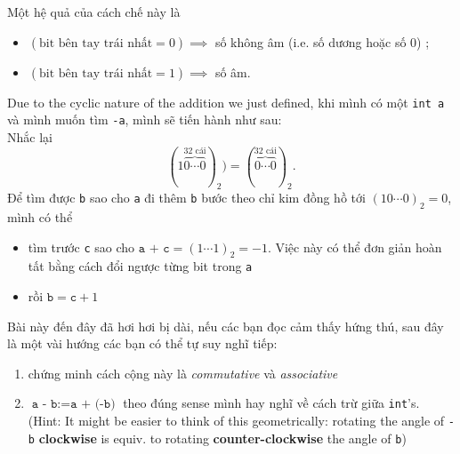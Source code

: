 \documentclass{article}
\begin{document}
Một hệ quả của cách chế này là
\begin{itemize}
	\item $(\textrm{bit bên tay trái nhất}=0) \implies$ số không âm (i.e. số dương hoặc số $0$) ;
	\item $(\textrm{bit bên tay trái nhất}=1) \implies$ số âm.
\end{itemize}

Due to the cyclic nature of the addition we just defined, khi mình có một \texttt{int a} và mình muốn tìm \texttt{-a}, mình sẽ tiến hành như sau:\\
Nhắc lại $$(1\overbrace{0\cdots0}^{\textrm{32 cái}})_{2} {}) = (\overbrace{0\cdots0}^{\textrm{32 cái}})_{2}.$$
Để tìm được \texttt{b} sao cho \texttt{a} đi thêm \texttt{b} bước theo chỉ kim đồng hồ tới $(10\cdots0)_{2} = 0$, mình có thể
\begin{itemize}
	\item tìm trước \texttt{c} sao cho $\texttt{a + c} = (1\cdots1)_{2} = -1$. Việc này có thể đơn giản hoàn tất bằng cách đổi ngược từng bit trong \texttt{a}
	\item rồi $\texttt{b} = \texttt{c} + 1$
\end{itemize}

Bài này đến đây đã hơi hơi bị dài, nếu các bạn đọc cảm thấy hứng thú, sau đây là một vài hướng các bạn có thể tự suy nghĩ tiếp:
\begin{enumerate}
	\item chứng minh cách cộng này là \emph{commutative} và \emph{associative}
	\item $\texttt{a - b} := \texttt{a + (-b)}$ theo đúng sense mình hay nghĩ về cách trừ giữa \texttt{int}'s. (Hint: It might be easier to think of this geometrically: rotating the angle of \texttt{-b} \textbf{clockwise} is equiv. to rotating \textbf{counter-clockwise} the angle of \texttt{b})
\end{enumerate}
\end{document}
